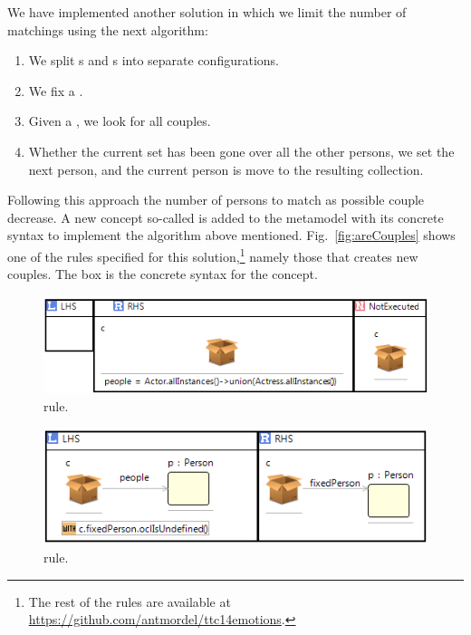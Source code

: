 We have implemented another solution in which we limit the number of matchings using the next algorithm:
\begin{enumerate}
  \item We split s and s into separate configurations.
  \item We fix a .
  \item Given a , we look for all couples.
  \item Whether the current  set has been gone over all the other persons, we set the next person, and the current person is move to the resulting collection.
\end{enumerate}

Following this approach the number of persons to match as possible couple decrease. A new concept so-called  is added to the metamodel with its concrete syntax to implement the algorithm above mentioned. Fig.~\ref{fig:areCouples} shows one of the rules specified for this solution,\footnote{The rest of the rules are available at \url{https://github.com/antmordel/ttc14emotions}.} namely those that creates new couples. The box is the concrete syntax for the  concept.

\begin{figure}[htp]
  \centering
  \includegraphics[width=\textwidth]{imgs/initialRule}
  \caption{ rule.}\label{fig:initialRule}
\end{figure}

\begin{figure}[htp]
  \centering
  \includegraphics[width=\textwidth]{imgs/fixPerson}
  \caption{ rule.}\label{fig:fixPerson}
\end{figure}

